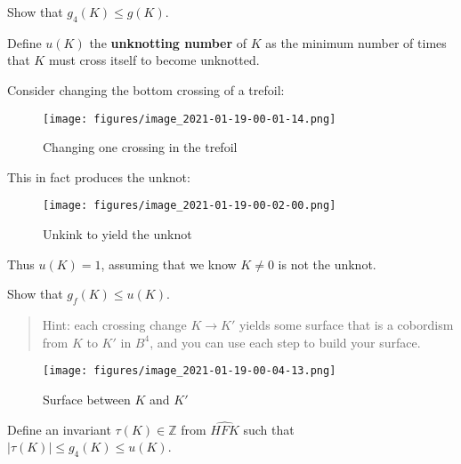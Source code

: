 \begin{exercise}[?]

Show that \(g_4(K) \leq g(K)\).

\end{exercise}

\begin{definition}

Define \(u(K)\) the \textbf{unknotting number} of \(K\) as the minimum
number of times that \(K\) must cross itself to become unknotted.

\end{definition}

\begin{example}

Consider changing the bottom crossing of a trefoil:

\begin{figure}
\centering
\texttt{[image: figures/image\_2021-01-19-00-01-14.png]}
\caption{Changing one crossing in the trefoil}
\end{figure}

This in fact produces the unknot:

\begin{figure}
\centering
\texttt{[image: figures/image\_2021-01-19-00-02-00.png]}
\caption{Unkink to yield the unknot}
\end{figure}

Thus \(u(K) = 1\), assuming that we know \(K \neq 0\) is not the unknot.

\end{example}

\begin{exercise}[?]

Show that \(g_f(K) \leq u(K)\).

\begin{quote}
Hint: each crossing change \(K\to K'\) yields some surface that is a
cobordism from \(K\) to \(K'\) in \(B^4\), and you can use each step to
build your surface.
\end{quote}

\begin{figure}
\centering
\texttt{[image: figures/image\_2021-01-19-00-04-13.png]}
\caption{Surface between \(K\) and \(K'\)}
\end{figure}

\end{exercise}

\begin{theorem}

Define an invariant \(\tau(K) \in {\mathbb{Z}}\) from \(\widehat{HFK}\)
such that
\({\left\lvert {\tau(K)} \right\rvert} \leq g_4(K) \leq u(K)\).

\end{theorem}

